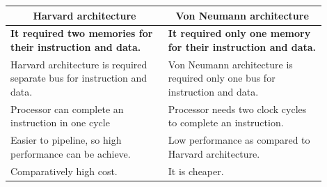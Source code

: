 \documentclass[a4paper]{article}
\begin{document}
\begin{enumerate}[label = \arabic*.]
      \begin{table}[H]
        \centering
        \begin{tabular}{p{0.45\linewidth} p{0.45\linewidth}}
          \toprule
          \multicolumn{1}{c}{\textbf{Harvard architecture}}                       & \multicolumn{1}{c}{\textbf{Von Neumann architecture}}                       \\
          \midrule
          \textbf{It required two memories for their instruction and data.}       & \textbf{It required only one memory for their instruction and data.}        \\
          \midrule
          Harvard architecture is required separate bus for instruction and data. & Von Neumann architecture is required only one bus for instruction and data. \\
          \midrule
          Processor can complete an instruction in one cycle                      & Processor needs two clock cycles to complete an instruction.                \\
          \midrule
          Easier to pipeline, so high performance can be achieve.                 & Low performance as compared to Harvard architecture.                        \\
          \midrule
          Comparatively high cost.                                                & It is cheaper.                                                              \\
          \bottomrule
        \end{tabular}
        \label{tab:von_neumann_havard}
      \end{table}
  \end{enumerate}
\end{document}
